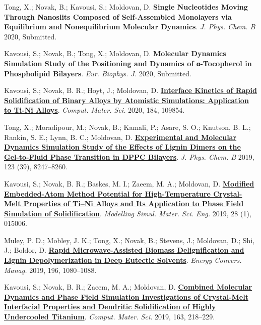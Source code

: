 \pagebreak


\begin{cventries}
  \cventry
    {} %
    {} %
    {} %
    {} %
    {
      \begin{cvitems} %
        \item {Tong, X.; Novak, B.; Kavousi, S.; Moldovan, D. \textbf{Single Nucleotides Moving Through Nanoslits Composed of Self-Assembled Monolayers via Equilibrium and Nonequilibrium Molecular Dynamics}. \textit{J. Phys. Chem. B} 2020, Submitted.}
        \item {Kavousi, S.; Novak, B.; Tong, X.; Moldovan, D. \textbf{Molecular Dynamics Simulation Study of the Positioning and Dynamics of α-Tocopherol in Phospholipid Bilayers}. \textit{Eur. Biophys. J.} 2020, Submitted.}
        \item {Kavousi, S.; Novak, B. R.; Hoyt, J.; Moldovan, D. \href{https://doi.org/10.1016/j.commatsci.2020.109854.}{\textbf{Interface Kinetics of Rapid Solidification of Binary Alloys by Atomistic Simulations: Application to Ti-Ni Alloys}}. \textit{Comput. Mater. Sci.} 2020, 184, 109854.}
        \item {Tong, X.; Moradipour, M.; Novak, B.; Kamali, P.; Asare, S. O.; Knutson, B. L.; Rankin, S. E.; Lynn, B. C.; Moldovan, D. \href{https://doi.org/10.1021/acs.jpcb.9b05525}{\textbf{Experimental and Molecular Dynamics Simulation Study of the Effects of Lignin Dimers on the Gel-to-Fluid Phase Transition in DPPC Bilayers}}. \textit{J. Phys. Chem. B} 2019, 123 (39), 8247–8260.}
        \item {Kavousi, S.; Novak, B. R.; Baskes, M. I.; Zaeem, M. A.; Moldovan, D. \href{https://doi.org/10.1088/1361-651X/ab580c}{\textbf{Modified Embedded-Atom Method Potential for High-Temperature Crystal-Melt Properties of Ti–Ni Alloys and Its Application to Phase Field Simulation of Solidification}}. \textit{Modelling Simul. Mater. Sci. Eng.} 2019, 28 (1), 015006.}
        \item {Muley, P. D.; Mobley, J. K.; Tong, X.; Novak, B.; Stevens, J.; Moldovan, D.; Shi, J.; Boldor, D. \href{https://doi.org/10.1016/j.enconman.2019.06.070}{\textbf{Rapid Microwave-Assisted Biomass Delignification and Lignin Depolymerization in Deep Eutectic Solvents}}. \textit{Energy Convers. Manag.} 2019, 196, 1080–1088.}
        \item {Kavousi, S.; Novak, B. R.; Zaeem, M. A.; Moldovan, D. \href{https://doi.org/10.1016/j.commatsci.2019.03.024}{\textbf{Combined Molecular Dynamics and Phase Field Simulation Investigations of Crystal-Melt Interfacial Properties and Dendritic Solidification of Highly Undercooled Titanium}}. \textit{Comput. Mater. Sci.} 2019, 163, 218–229.}

\end{cvitems}}
\end{cventries}
